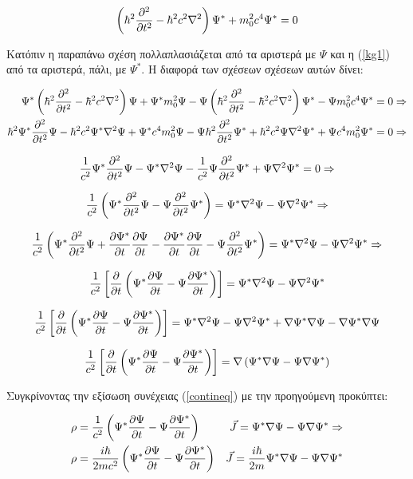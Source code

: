 \[
\left(  \hbar^2 \frac{\partial ^2}{\partial t^2}- \hbar^2 c^2 \nabla^2 \right)  \Psi^* +m_0^2 c^4 \Psi^* = 0
\]

Κατόπιν η παραπάνω σχέση πολλαπλασιάζεται από τα αριστερά με $\Psi$ και η (\ref{kg1}) από τα αριστερά, πάλι, με $\Psi^*$. Η διαφορά των σχέσεων σχέσεων αυτών δίνει: 

\begin{align*}
  \Psi^* \left(   \hbar^2 \frac{\partial ^2}{\partial t^2}- \hbar^2 c^2 \nabla^2 \right)  \Psi +\Psi^* m_0^2 \Psi - \Psi \left(  \hbar^2\frac{\partial ^2}{\partial t^2}- \hbar^2 c^2 \nabla^2 \right)  \Psi^* -\Psi m_0^2 c^4 \Psi^* &= 0 \Rightarrow
  \\ \hbar^2\Psi^* \frac{\partial ^2}{\partial t^2} \Psi - \hbar^2 c^2\Psi^* \nabla^2\Psi +\Psi^* c^4 m_0^2 \Psi - \Psi \hbar^2\frac{\partial ^2}{\partial t^2}\Psi^* + \hbar^2 c^2 \Psi \nabla^2 \Psi^* + \Psi c^4  m_0^2 \Psi^* &= 0 \Rightarrow
\end{align*}

\[
 \frac{1}{c^2}\Psi^* \frac{\partial ^2}{\partial t^2} \Psi - \Psi^* \nabla^2\Psi  - \frac{1}{c^2} \Psi \frac{\partial ^2}{\partial t^2}\Psi^* + \Psi \nabla^2 \Psi^* = 0 \Rightarrow
\]

\[
 \frac{1}{c^2} \left(  \Psi^* \frac{\partial ^2}{\partial t^2} \Psi - \Psi \frac{\partial ^2}{\partial t^2}\Psi^* \right)  = \Psi^* \nabla^2\Psi- \Psi \nabla^2 \Psi^*  \Rightarrow
\]

\[ 
\frac{1}{c^2} \left(  \Psi^* \frac{\partial ^2}{\partial t^2} \Psi + \frac{\partial \Psi^*}{\partial t} \frac{\partial \Psi}{\partial t}-\frac{\partial \Psi^*}{\partial t} \frac{\partial \Psi}{\partial t}- \Psi \frac{\partial ^2}{\partial t^2}\Psi^* \right)  = \Psi^* \nabla^2\Psi- \Psi \nabla^2 \Psi^*  \Rightarrow
\]

\[
 \frac{1}{c^2} \left[  \frac{\partial }{\partial t} \left(  \Psi^* \frac{\partial \Psi}{\partial t} - \Psi\frac{\partial \Psi^*}{\partial t} \right)  \right]  = \Psi^* \nabla^2\Psi- \Psi \nabla^2 \Psi^*  
\]

\[
\frac{1}{c^2} \left[  \frac{\partial }{\partial t} \left(  \Psi^* \frac{\partial \Psi}{\partial t} - \Psi\frac{\partial \Psi^*}{\partial t} \right)  \right]  = \Psi^* \nabla^2\Psi- \Psi \nabla^2 \Psi^*+\nabla \Psi^* \nabla \Psi-  \nabla \Psi^* \nabla \Psi  
\]

\begin{equation}
 \frac{1}{c^2} \left[  \frac{\partial }{\partial t} \left(  \Psi^* \frac{\partial \Psi}{\partial t} - \Psi\frac{\partial \Psi^*}{\partial t} \right)  \right]  = \nabla \left(  \Psi^* \nabla \Psi- \Psi \nabla \Psi^* \right)   
 \label{fineqfree}
\end{equation}

Συγκρίνοντας την εξίσωση συνέχειας (\ref{contineq}) με την προηγούμενη προκύπτει: 

\begin{align}
  \notag \rho &= \frac{1}{c^2} \left(  \Psi^* \frac{\partial \Psi}{\partial t} - \Psi\frac{\partial \Psi^*}{\partial t} \right)    &\vec{J}= \Psi^* \nabla \Psi- \Psi \nabla \Psi^*   \Rightarrow
  \\  \rho &= \frac{i\hbar}{2mc^2} \left(  \Psi^* \frac{\partial \Psi}{\partial t} - \Psi\frac{\partial \Psi^*}{\partial t} \right)    &\vec{J}= \frac{i\hbar}{2m}\Psi^* \nabla \Psi- \Psi \nabla \Psi^*   
  \label{currentfree}
\end{align}

